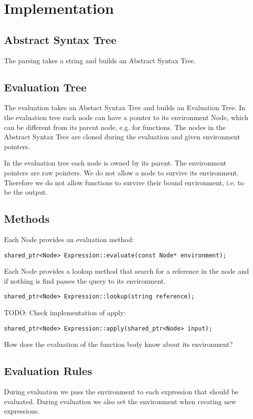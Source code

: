 \documentclass[a4paper,12pt]{article}
\begin{document}
\section{Implementation}

\subsection{Abstract Syntax Tree}
The parsing takes a string and builds an Abstract Syntax Tree.

\subsection{Evaluation Tree}

The evaluation takes an Abstact Syntax Tree and builds an Evaluation Tree. In the evaluation tree each node can have a pointer to its environment Node, which can be different from its parent node, e.g. for functions. The nodes in the Abstract Syntax Tree are cloned during the evaluation and given environment pointers.

In the evaluation tree each node is owned by its parent. The environment pointers are raw pointers. We do not allow a node to survive its environment. Therefore we do not allow functions to survive their bound environment, i.e. to be the output.

\subsection{Methods}

Each Node provides an evaluation method:
\begin{verbatim}
shared_ptr<Node> Expression::evaluate(const Node* environment);
\end{verbatim}
Each Node provides a lookup method that search for a reference in the node and if nothing is find passes the query to its environment.
\begin{verbatim}
shared_ptr<Node> Expression::lookup(string reference);
\end{verbatim}
TODO: Check implementation of apply:
\begin{verbatim}
shared_ptr<Node> Expression::apply(shared_ptr<Node> input);
\end{verbatim}
How does the evaluation of the function body know about its environment?

\clearpage

\subsection{Evaluation Rules}
During evaluation we pass the environment to each expression that should be evaluated. During evaluation we also set the environment when creating new expressions.
\end{document}
